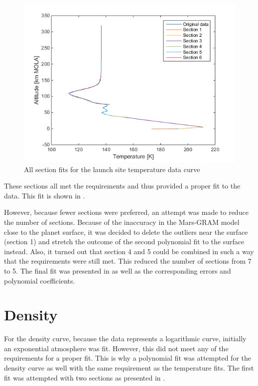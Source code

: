\begin{figure}[H]
\centering
\includegraphics[width=0.6 \textwidth]{figures/software/completePolyFitTempSplit7.png}
\caption{All section fits for the launch site temperature data curve}
\label{fig:completePolyFitTempSplit7}
\end{figure}

\noindent
These sections all met the requirements and thus provided a proper fit to the data. This fit is shown in .


However, because fewer sections were preferred, an attempt was made to reduce the number of sections. Because of the inaccuracy in the Mars-\ac{GRAM} model close to the planet surface, it was decided to delete the outliers near the surface (section 1) and stretch the outcome of the second polynomial fit to the surface instead. Also, it turned out that section 4 and 5 could be combined in such a way that the requirements were still met. This reduced the number of sections from 7 to 5. The final fit was presented in  as well as the corresponding errors and polynomial coefficients.                                                                                      




\section{Density}
\label{appsec:denFit}
For the density curve, because the data represents a logarithmic curve, initially an exponential atmosphere was fit. However, this did not meet any of the requirements for a proper fit. This is why a polynomial fit was attempted for the density curve as well with the same requirement as the temperature fits. The first fit was attempted with two sections as presented in . 

